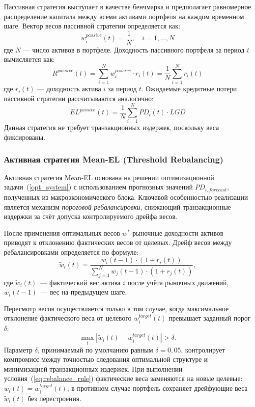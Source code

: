 \documentclass[]{article}
\begin{document}
	Пассивная стратегия выступает в качестве бенчмарка и предполагает равномерное распределение капитала между
	всеми активами портфеля на каждом временном шаге. Вектор весов пассивной стратегии определяется как:
	\begin{equation}
		\label{eq:passive_weights}
		w_i^{passive}(t) = \frac{1}{N}, \quad i = 1, \dots, N
	\end{equation}
	где $N$ --- число активов в портфеле. Доходность пассивного портфеля за период $t$ вычисляется как:
	\begin{equation}
		R^{passive}(t) = \sum_{i=1}^N w_i^{passive} \cdot r_i(t) = \frac{1}{N} \sum_{i=1}^N r_i(t)
	\end{equation}
	где $r_i(t)$ --- доходность актива $i$ за период $t$. Ожидаемые кредитные потери пассивной стратегии
	рассчитываются аналогично:
	\begin{equation}
		EL^{passive}(t) = \frac{1}{N} \sum_{i=1}^N PD_i(t) \cdot LGD
	\end{equation}
	Данная стратегия не требует транзакционных издержек, поскольку веса фиксированы.

	\subsubsection{Активная стратегия Mean-EL (Threshold Rebalancing)}

	Активная стратегия Mean-EL основана на решении оптимизационной задачи~(\ref{opt_system}) с
	использованием прогнозных значений $PD_{i, forecast}$, полученных из макроэкономического блока.
	Ключевой особенностью реализации является механизм \emph{пороговой ребалансировки}, снижающий
	транзакционные издержки за счёт допуска контролируемого дрейфа весов.

	После применения оптимальных весов $w^{*}$ рыночные доходности активов приводят к отклонению
	фактических весов от целевых. Дрейф весов между ребалансировками определяется по формуле:
	\begin{equation}
		\label{eq:weight_drift}
		\tilde{w}_i(t) = \frac{w_i(t-1) \cdot (1 + r_i(t))}{\sum_{j=1}^N w_j(t-1) \cdot (1 + r_j(t))},
	\end{equation}
	где $\tilde{w}_i(t)$~--- фактический вес актива $i$ после учёта рыночных движений, $w_i(t-1)$~---
	вес на предыдущем шаге.

	Пересмотр весов осуществляется только в том случае, когда максимальное отклонение фактического
	веса от целевого $w_i^{target}(t)$ превышает заданный порог $\delta$:
	\begin{equation}
		\label{eq:rebalance_rule}
		\max_i \left| \tilde{w}_i(t) - w_i^{target}(t) \right| > \delta.
	\end{equation}
	Параметр $\delta$, принимаемый по умолчанию равным $\delta = 0{,}05$, контролирует компромисс
	между точностью следования оптимальной структуре и минимизацией транзакционных издержек. При
	выполнении условия~(\ref{eq:rebalance_rule}) фактические веса заменяются на новые целевые:
	$w_i(t) = w_i^{target}(t)$; в противном случае портфель сохраняет дрейфующие веса
	$\tilde{w}_i(t)$ без перестроения.
\end{document}
